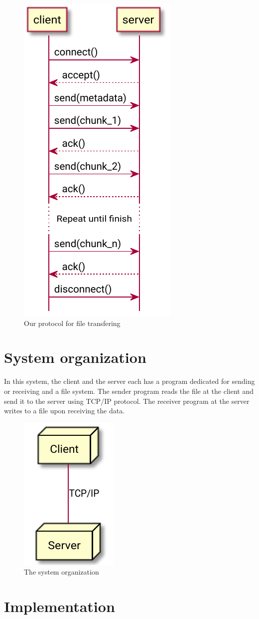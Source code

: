 \documentclass{article}
\begin{document}
\begin{figure}
	\centering
	\includegraphics{pw1/protocol.pdf}
	\caption{Our protocol for file transfering}
\end{figure}

\section{System organization}

In this system, the client and the server each has a program dedicated for sending or receiving
and a file system. The sender program reads the file at the client and send it to the server
using TCP/IP protocol. The receiver program at the server writes to a file upon receiving the data.

\begin{figure}
	\centering
	\includegraphics{pw1/system-org.pdf}
	\caption{The system organization}
\end{figure}

\section{Implementation}
\end{document}
